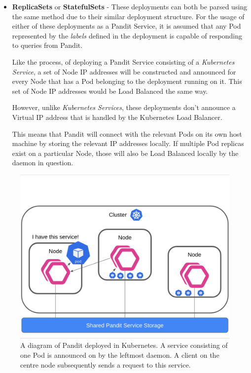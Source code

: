 \documentclass[a4paper,12pt]{report}
\begin{document}
\begin{itemize}
    \item \textbf{ReplicaSets} or \textbf{StatefulSets} - These deployments can both be parsed using the same method due to their similar deployment structure.
    For the usage of either of these deployments as a Pandit Service, it is assumed that any Pod represented by the \textit{labels \cite{labels}} 
    defined in the deployment is capable of responding to queries from Pandit.
    
    Like the process, of deploying a Pandit Service consisting of a \textit{Kubernetes Service}, a set of Node IP addresses will be constructed and 
    announced for every Node that has a Pod belonging to the deployment running on it. This set of Node IP addresses would be Load Balanced the same way.
    
    However, unlike \textit{Kubernetes Services}, these deployments don't announce a Virtual IP address \cite{vip} that is handled by the Kubernetes Load Balancer.
    
    This means that Pandit will connect with the relevant Pods on its own host machine by storing the relevant IP addresses locally. 
    If multiple Pod replicas exist on a particular Node, those will also be Load Balanced locally by the daemon in question.
    
\end{itemize}
\begin{figure}[hbt!]
    \centering
    \includegraphics[width=\linewidth]{k8s.png}
    \caption{A diagram of Pandit deployed in Kubernetes. A service consisting of one Pod is announced on by the leftmost daemon. A client on the centre node subsequently sends a request to this service.}
\end{figure}
\newpage
\end{document}
